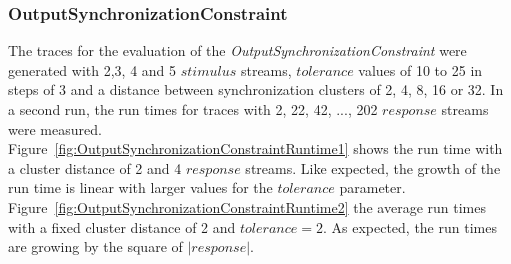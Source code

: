 \subsubsection{OutputSynchronizationConstraint}
The traces for the evaluation of the \textit{OutputSynchronizationConstraint} were generated with 2,3, 4 and 5 $stimulus$ streams, $tolerance$ values of 10 to 25 in steps of 3 and a distance between synchronization clusters of 2, 4, 8, 16 or 32. In a second run, the run times for traces with 2, 22, 42, ..., 202 $response$ streams were measured.\\
Figure~\ref{fig:OutputSynchronizationConstraintRuntime1} shows the run time with a cluster distance of 2 and 4 $response$ streams. Like expected, the growth of the run time is linear with larger values for the $tolerance$ parameter. Figure~\ref{fig:OutputSynchronizationConstraintRuntime2}  the average run times with a fixed cluster distance of 2 and $tolerance=2$. As expected, the run times are growing by the square of $|response|$.

